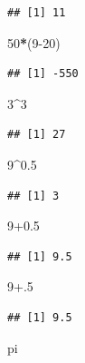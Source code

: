 \documentclass[
]{book}
\newenvironment{Shaded}{\begin{snugshade}}{\end{snugshade}}
\newcommand{\DecValTok}[1]{\textcolor[rgb]{0.00,0.00,0.81}{#1}}
\newcommand{\FloatTok}[1]{\textcolor[rgb]{0.00,0.00,0.81}{#1}}
\newcommand{\NormalTok}[1]{#1}
\newcommand{\OperatorTok}[1]{\textcolor[rgb]{0.81,0.36,0.00}{\textbf{#1}}}
\begin{document}
\begin{verbatim}
## [1] 11
\end{verbatim}

\begin{Shaded}
\begin{Highlighting}[]
\DecValTok{50}\OperatorTok{*}\NormalTok{(}\DecValTok{9-20}\NormalTok{)}
\end{Highlighting}
\end{Shaded}

\begin{verbatim}
## [1] -550
\end{verbatim}

\begin{Shaded}
\begin{Highlighting}[]
\DecValTok{3}\OperatorTok{^}\DecValTok{3}
\end{Highlighting}
\end{Shaded}

\begin{verbatim}
## [1] 27
\end{verbatim}

\begin{Shaded}
\begin{Highlighting}[]
\DecValTok{9}\OperatorTok{^}\FloatTok{0.5}
\end{Highlighting}
\end{Shaded}

\begin{verbatim}
## [1] 3
\end{verbatim}

\begin{Shaded}
\begin{Highlighting}[]
\DecValTok{9}\FloatTok{+0.5}
\end{Highlighting}
\end{Shaded}

\begin{verbatim}
## [1] 9.5
\end{verbatim}

\begin{Shaded}
\begin{Highlighting}[]
\DecValTok{9}\FloatTok{+.5}
\end{Highlighting}
\end{Shaded}

\begin{verbatim}
## [1] 9.5
\end{verbatim}

\begin{Shaded}
\begin{Highlighting}[]
\NormalTok{pi}
\end{Highlighting}
\end{Shaded}
\end{document}
